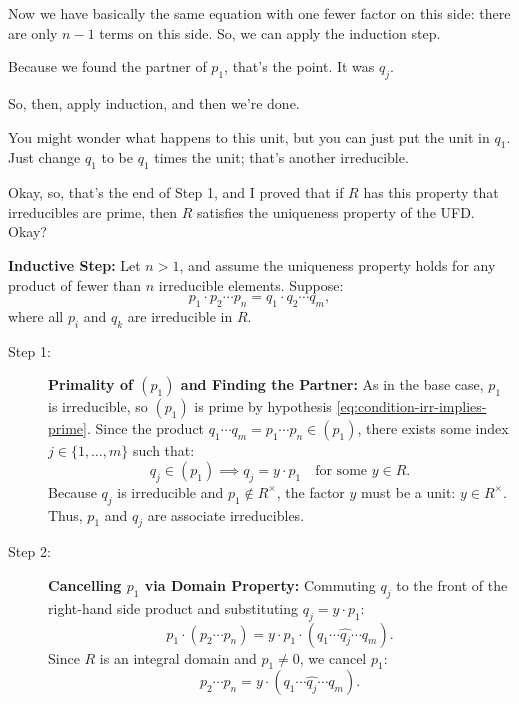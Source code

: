 \begin{proofWrapper}
\begin{speech}[00:43:15 - 00:45:19]
Now we have basically the same equation with one fewer factor on this side: there are only $n - 1$ terms on this side. So, we can apply the induction step.

Because we found the partner of $p_1$, that's the point. It was $q_j$. 

So, then, apply induction, and then we're done. 

You might wonder what happens to this unit, but you can just put the unit in $q_1$. Just change $q_1$ to be $q_1$ times the unit; that's another irreducible.

Okay, so, that's the end of Step 1, and I proved that if $R$ has this property that irreducibles are prime, then $R$ satisfies the uniqueness property of the UFD. Okay?
\end{speech}

\begin{content}
\textbf{Inductive Step:} Let $n > 1$, and assume the uniqueness property holds for any product of fewer than $n$ irreducible elements. Suppose:
\begin{equation}\label{eq:induction-setup}
p_1 \cdot p_2 \cdots p_n = q_1 \cdot q_2 \cdots q_m,
\end{equation}
where all $p_i$ and $q_k$ are irreducible in $R$.

\begin{description}
    \item[Step 1:] \textbf{Primality of $(p_1)$ and Finding the Partner:} As in the base case, $p_1$ is irreducible, so $(p_1)$ is prime by hypothesis \eqref{eq:condition-irr-implies-prime}. Since the product $q_1 \cdots q_m = p_1 \cdots p_n \in (p_1)$, there exists some index $j \in \{1, \dots, m\}$ such that:
    \begin{equation}\label{eq:induction-qj-in-p1}
    q_j \in (p_1) \implies q_j = y \cdot p_1 \quad \text{for some } y \in R.
    \end{equation}
    Because $q_j$ is irreducible and $p_1 \notin R^\times$, the factor $y$ must be a unit: $y \in R^\times$. Thus, $p_1$ and $q_j$ are associate irreducibles.
    
    \item[Step 2:] \textbf{Cancelling $p_1$ via Domain Property:} Commuting $q_j$ to the front of the right-hand side product and substituting $q_j = y \cdot p_1$:
    \begin{equation}\label{eq:induction-subst}
    p_1 \cdot (p_2 \cdots p_n) = y \cdot p_1 \cdot (q_1 \cdots \widehat{q_j} \cdots q_m).
    \end{equation}
    Since $R$ is an integral domain and $p_1 \neq 0$, we cancel $p_1$:
    \begin{equation}\label{eq:induction-canceled}
    p_2 \cdots p_n = y \cdot (q_1 \cdots \widehat{q_j} \cdots q_m).
    \end{equation}
    

\end{description}
\end{content}
\end{proofWrapper}
